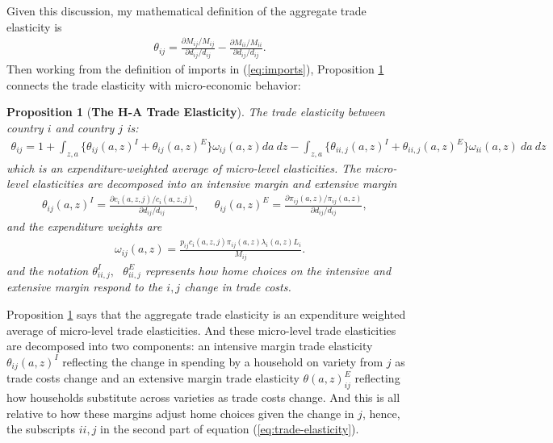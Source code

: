 \documentclass[12pt,pdftex]{article}
\newtheorem{prp}{Proposition}
\begin{document}
\begin{onehalfspacing}
Given this discussion, my mathematical definition of the aggregate trade elasticity is
\begin{align}
\theta_{ij} = \frac{\partial M_{ij} / M_{ij}}{\partial d_{ij} / d_{ij}}  - \frac{\partial M_{ii} / M_{ii}}{\partial d_{ij} / d_{ij}}.
\label{eq:def_trade_elasticity}
\end{align}
Then working from the definition of imports in (\ref{eq:imports}), Proposition \ref{prp:GET} connects the trade elasticity with micro-economic behavior:
\begin{prp}[\textbf{The H-A Trade Elasticity}] \label{prp:GET} The trade elasticity between country $i$ and country $j$ is:
{\footnotesize
\begin{align}
\theta_{ij} = 1 + \int_{z,a} \bigg \{ \theta_{ij}(a,z)^{I} + \theta_{ij}(a,z)^{E} \bigg \}\omega_{ij}(a,z)da \ dz - \int_{z,a} \bigg \{ \theta_{ii,j}(a,z)^{I} + \theta_{ii,j}(a,z)^{E} \bigg \}\omega_{ii}(a,z) \ da \ dz
\label{eq:trade-elasticity}
\end{align}
}which is an expenditure-weighted average of micro-level elasticities. The micro-level elasticities are decomposed into an intensive margin and extensive margin
{\footnotesize
\begin{align}
\nonumber
\theta_{ij}(a,z)^{I} = \frac{\partial c_{i}(a,z,j)/ c_{i}(a,z,j)}{\partial d_{ij} / d_{ij}}, \ \ \ \ \ \ \theta_{ij}(a,z)^{E} = \frac{\partial \pi_{ij}(a,z) / \pi_{ij}(a,z)}{\partial d_{ij} / d_{ij}}, \ \ \ \
\end{align}
}
and the expenditure weights are
{\footnotesize
\begin{align}
\nonumber
\omega_{ij}(a,z) = \frac{p_{ij}c_{i}(a,z,j)\pi_{ij}(a,z) \lambda_{i}(a,z) L_i}{M_{ij}}.
\end{align}
}
and the notation $\theta_{ii,j}^I,  \ \ \ \theta_{ii,j}^E $ represents how home choices on the intensive and extensive margin respond to the $i,j$ change in trade costs.
\end{prp}
Proposition \ref{prp:GET} says that the aggregate trade elasticity is an expenditure weighted average of micro-level trade elasticities. And these micro-level trade elasticities are decomposed into two components: an intensive margin trade elasticity $\theta_{ij}(a,z)^{I}$ reflecting the change in spending by a household on variety from $j$ as trade costs change and an extensive margin trade elasticity $\theta(a,z)_{ij}^{E}$ reflecting how households substitute across varieties as trade costs change. And this is all relative to how these margins adjust home choices given the change in $j$, hence, the subscripts $ii,j$ in the second part of equation (\ref{eq:trade-elasticity}).


\end{onehalfspacing}
\end{document}
